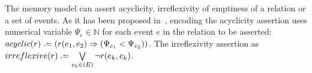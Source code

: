The memory model can assert acyclicity, irreflexivity of emptiness of a relation or a set of events.
As it has been proposed in~\cite{Porthos17a}, encoding the acyclicity assertion uses numerical variable $\Psi_e \in \mathbb{N}$ for each event $e$ in the relation to be asserted: $acyclic(r) \defeq (r(e_1,e_2) \Rightarrow (\Psi_{e_1} < \Psi_{e_2}))$.
The irreflexivity assertion as $irreflexive(r) \defeq \bigvee\limits_{e_k \in \mathbb(E)}^{} \lnot r(e_k,e_k)$.




%
